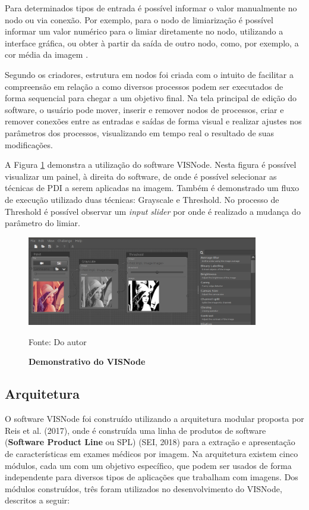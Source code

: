 \documentclass[
	12pt,				%
	oneside,			%
	a4paper,			%
	english,			%
	french,				%
	spanish,			%
	brazil,				%
	]{abntex2}
\begin{document}
Para determinados tipos de entrada é possível informar o valor manualmente no nodo ou via conexão. Por exemplo, para o nodo de limiarização é possível informar um valor numérico para o limiar diretamente no nodo, utilizando a interface gráfica, ou obter à partir da saída de outro nodo, como, por exemplo, a cor média da imagem \cite{visnode}.

Segundo os criadores, estrutura em nodos foi criada com o intuito de facilitar a compreensão em relação a como diversos processos podem ser executados de forma sequencial para chegar a um objetivo final. Na tela principal de edição do software, o usuário pode mover, inserir e remover nodos de processos, criar e remover conexões entre as entradas e saídas de forma visual e realizar ajustes nos parâmetros dos processos, visualizando em tempo real o resultado de suas modificações.

A Figura \ref{fig:visnode} demonstra a utilização do software VISNode. Nesta figura é possível visualizar um painel, à direita do software, de onde é possível selecionar as técnicas de PDI a serem aplicadas na imagem. Também é demonstrado um fluxo de execução utilizado duas técnicas: Grayscale e Threshold. No processo de Threshold é possível observar um \textit{input slider} por onde é realizado a mudança do parâmetro do limiar.

\begin{figure}[ht]
\centering
\caption{\textbf{Demonstrativo do VISNode}}
\includegraphics[width=0.9\textwidth]{imagens/visnode.png}

Fonte: Do autor
\label{fig:visnode}
\end{figure}

\subsection{Arquitetura}

O software VISNode foi construído utilizando a arquitetura modular proposta por Reis et al. (2017), onde é construída uma linha de produtos de software (\textbf{Software Product Line} ou SPL) (SEI, 2018)  para a extração e apresentação de características em exames médicos por imagem. Na arquitetura existem cinco módulos, cada um com um objetivo específico, que podem ser usados de forma independente para diversos tipos de aplicações que trabalham com imagens. Dos módulos construídos, três foram utilizados no desenvolvimento do VISNode, descritos a seguir:
\end{document}
